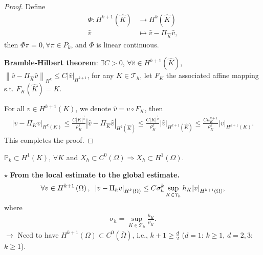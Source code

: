 \documentclass[11pt,a4paper,center,notitlepage]{article}
\numberwithin{equation}{section}
\begin{document}
\begin{proof}
Define
\begin{align} 
\Phi :{H^{k + 1}}\left( {\widehat K} \right) &\to {H^k}\left( {\widehat K} \right)\\
\widehat v &\mapsto \widehat v - {\Pi _{\widehat K}}\widehat v,
\end{align}
then $\Phi \pi  = 0,\forall \pi  \in {P_k}$, and $\Phi$ is linear continuous.

\textbf{Bramble-Hilbert theorem}: $\exists C > 0$, $\forall \widehat v \in {H^{k + 1}}\left( {\widehat K} \right)$, ${\left\| {\widehat v - {\Pi _{\widehat K}}\widehat v} \right\|_{{H^k}}} \le C{\left| {\widehat v} \right|_{{H^{k + 1}}}}$, for any $K \in \mathcal{T}_h$, let $F_K$ the associated affine mapping s.t. $F_K\left(\widehat{K}\right)=K$.

For all $v\in H^{k+1}\left(K\right)$, we denote $\widehat v = v \circ {F_K}$, then
\begin{align}
{\left| {v - {\Pi _K}v} \right|_{{H^k}\left( K \right)}} \le \frac{{C{{\left| K \right|}^{\frac{1}{2}}}}}{{\rho _K^k}}{\left| {\widehat v - {\Pi _{\widehat K}}\widehat v} \right|_{{H^k}\left( {\widehat K} \right)}} \le \frac{{C{{\left| K \right|}^{\frac{1}{2}}}}}{{\rho _K^k}}{\left| {\widehat v} \right|_{{H^{k + 1}}\left( {\widehat K} \right)}} \le \frac{{Ch_K^{k + 1}}}{{\rho _K^k}}{\left| v \right|_{{H^{k + 1}}\left( K \right)}}.
\end{align}
This completes the proof.
\end{proof}
${\mathbb{P}_k} \subset {H^1}\left( K \right)$, $\forall K$ and ${X_h} \subset {C^0}\left( \Omega  \right) \Rightarrow {X_h} \subset {H^1}\left( \Omega  \right)$. 

\noindent
$\star$ \textbf{From the local estimate to the global estimate.} 
\begin{align}
\forall v \in {H^{k + 1}}\left( \Omega  \right),\hspace{2mm} {\left| {v - {\Pi _h}v} \right|_{{H^k}\left( \Omega  \right)}} \le C\sigma _h^k\mathop {\sup }\limits_{K \in {\mathcal{T}_h}} {h_K}{\left| v \right|_{{H^{k + 1}}\left( \Omega  \right)}},
\end{align}
where
\begin{align}
{\sigma _h} = \mathop {\sup }\limits_{K \in {\mathcal{T}_h}} \frac{{{h_K}}}{{{\rho _K}}} .
\end{align}
$\to$ Need to have ${H^{k + 1}}\left( \Omega  \right) \subset {C^0}\left( {\overline \Omega  } \right)$, i.e., $k+1\ge \frac{d}{2}$ ($d=1$: $k\ge 1$, $d=2,3$: $k\ge 1$).
\end{document}
